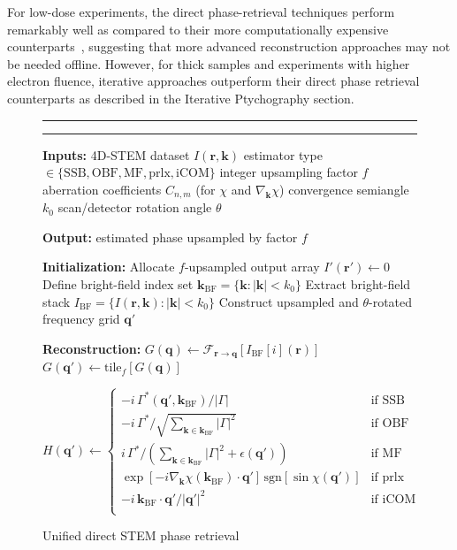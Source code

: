 \documentclass[pdflatex,sn-aps,iicol]{sn-jnl}%
\begin{document}
For low-dose experiments, the direct phase-retrieval techniques perform remarkably well as compared to their more computationally expensive counterparts~\cite{Varnavides_2025_ssnr}, suggesting that more advanced reconstruction approaches may not be needed offline.
However, for thick samples and experiments with higher electron fluence, iterative approaches outperform their direct phase retrieval counterparts as described in the Iterative Ptychography section.

\begin{figure}
\renewcommand{\figurename}{Algorithm}
\hrule \vspace{5pt}
\caption{Unified direct STEM phase retrieval}
\vspace{5pt} \hrule \vspace{5pt}
\label{unified-pseudocode}
\begin{algorithmic}

\Statex \textbf{Inputs:}
\Statex \quad 4D-STEM dataset $I(\boldsymbol{r},\boldsymbol{k})$
\Statex \quad estimator type $\in\{\text{SSB},\text{OBF},\text{MF},\text{prlx},\text{iCOM}\}$
\Statex \quad integer upsampling factor $f$
\Statex \quad aberration coefficients $C_{n,m}$ (for $\chi$ and $\nabla_{\boldsymbol{k}}\chi$)
\Statex \quad convergence semiangle $k_0$
\Statex \quad scan/detector rotation angle $\theta$

\Statex \textbf{Output:} estimated phase upsampled by factor $f$

\Statex
\Statex \textbf{Initialization:}
\Statex Allocate $f$-upsampled output array $I'(\boldsymbol{r}') \leftarrow 0$
\Statex Define bright-field index set $\boldsymbol{k}_{\mathrm{BF}}=\{\boldsymbol{k}:|\boldsymbol{k}|<k_0\}$
\Statex Extract bright-field stack $I_{\mathrm{BF}}=\{I(\boldsymbol{r},\boldsymbol{k}):|\boldsymbol{k}|<k_0\}$
\Statex Construct upsampled and $\theta$-rotated frequency grid $\boldsymbol{q}'$

\Statex
\Statex \textbf{Reconstruction:}
  \Statex $G(\boldsymbol{q}) \leftarrow \mathcal{F}_{\boldsymbol{r}\rightarrow\boldsymbol{q}}\!\left[I_{\mathrm{BF}}[i](\boldsymbol{r})\right]$
  \Statex $G(\boldsymbol{q}') \leftarrow \mathrm{tile}_f\!\left[G(\boldsymbol{q})\right]$

  \Statex $H(\boldsymbol{q}')\leftarrow \begin{cases}
    -i\,\Gamma^*(\boldsymbol{q}',\boldsymbol{k}_{\mathrm{BF}})/|\Gamma| & \text{if SSB} \\
    -i\,\Gamma^*/\sqrt{\sum_{\boldsymbol{k}\in\boldsymbol{k}_{\mathrm{BF}}}|\Gamma|^2} & \text{if OBF} \\
    i\,\Gamma^*/\left(\sum_{\boldsymbol{k}\in\boldsymbol{k}_{\mathrm{BF}}}|\Gamma|^2+\epsilon(\boldsymbol{q}')\right) & \text{if MF} \\
    \exp[-i\nabla_{\boldsymbol{k}}\chi(\boldsymbol{k}_{\mathrm{BF}})\!\cdot\!\boldsymbol{q}']\,\mathrm{sgn}[\sin\chi(\boldsymbol{q}')] & \text{if prlx} \\
    -i\,\boldsymbol{k}_{\mathrm{BF}}\!\cdot\!\boldsymbol{q}'/|\boldsymbol{q}'|^2 & \text{if iCOM} \\
  \end{cases}$


\end{algorithmic}
\end{figure}
\end{document}
